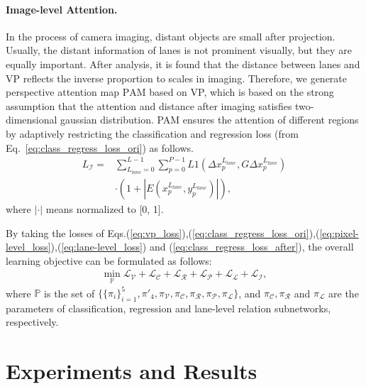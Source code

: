 \documentclass{article}
\begin{document}
\paragraph{Image-level Attention.}
In the process of camera imaging, distant objects are small after projection. Usually, the distant information of lanes is not prominent visually, but they are equally important. After analysis, it is found that the distance between lanes and VP reflects the inverse proportion to scales in imaging. Therefore, we generate perspective attention map $\text{PAM}$ based on VP, which is based on the strong assumption that the attention and distance after imaging satisfies two-dimensional gaussian distribution. PAM ensures the attention of different regions by adaptively restricting the classification and regression loss (from Eq.~\ref{eq:class_regress_loss_ori}) as follows.
\begin{equation}\label{eq:class_regress_loss_after}
\begin{aligned}
L_{\mathcal{I}} =& \sum_{L_{lane} = 0}^{L-1} \sum_{p = 0}^{P - 1} L1(\Delta x^{L_{lane}}_p, G\Delta x^{L_{lane}}_p) \\
 & \cdot (1 +  |E(x^{L_{lane}}_p, y^{L_{lane}}_p)|), 
\end{aligned}
\end{equation}
where $|\cdot|$ means normalized to [0, 1].

By taking the losses of Eqs.(\ref{eq:vp_loss}),(\ref{eq:class_regress_loss_ori}),(\ref{eq:pixel-level_loss}),(\ref{eq:lane-level_loss}) and (\ref{eq:class_regress_loss_after}), the overall learning objective can be formulated as follows:
\begin{equation}\label{eq:total_loss}
\begin{aligned}
\min _{\mathbb{P}} \mathcal{L}_\mathcal{V} + \mathcal{L}_\mathcal{C} + \mathcal{L}_\mathcal{R} + \mathcal{L}_\mathcal{P} + \mathcal{L}_\mathcal{L} + \mathcal{L}_\mathcal{I},
\end{aligned}
\end{equation}
where $\mathbb{P}$ is the set of $\{\{\pi_i\}^5_{i=1}, \pi'_4, \pi_\mathcal{V}, \pi_\mathcal{C}, \pi_\mathcal{R}, \pi_\mathcal{P}, \pi_\mathcal{L}\}$, and $\pi_\mathcal{C}, \pi_\mathcal{R}$ and $\pi_\mathcal{L}$ are the parameters of classification, regression and lane-level relation subnetworks, respectively.

\section{Experiments and Results}
\end{document}
